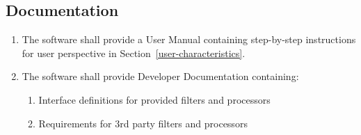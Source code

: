 \documentclass[titlepage]{article}
\begin{document}
\subsection{Documentation%
  \label{documentation}%
}
\begin{enumerate}
    \item The software shall provide a User Manual containing  step-by-step
        instructions for user perspective in Section~\ref{user-characteristics}.
    \item The software shall provide Developer Documentation containing:
    \begin{enumerate}
        \item Interface definitions for provided filters and processors
        \item Requirements for 3rd party filters and processors
    \end{enumerate}
\end{enumerate}


\appendix
\pagebreak
\end{document}
